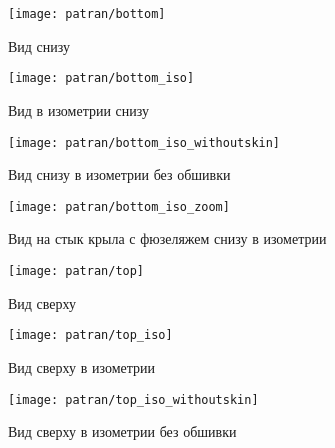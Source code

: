 \begin{figure}[H]
\centering
\texttt{[image: patran/bottom]}
\caption{Вид снизу}
\label{fig:patranBottom}
\end{figure}

\begin{figure}[H]
\centering
\texttt{[image: patran/bottom\_iso]}
\caption{Вид в изометрии снизу}
\label{fig:patranBottomIso}
\end{figure}

\begin{figure}[H]
\centering
\texttt{[image: patran/bottom\_iso\_withoutskin]}
\caption{Вид снизу в изометрии без обшивки}
\label{fig:patranBottomIsoWithoutSkin}
\end{figure}

\begin{figure}[H]
\centering
\texttt{[image: patran/bottom\_iso\_zoom]}
\caption{Вид на стык крыла с фюзеляжем снизу в изометрии}
\label{fig:patranBottomIsoZoom}
\end{figure}

\begin{figure}[H]
\centering
\texttt{[image: patran/top]}
\caption{Вид сверху}
\label{fig:patranTop}
\end{figure}

\begin{figure}[H]
\centering
\texttt{[image: patran/top\_iso]}
\caption{Вид сверху в изометрии}
\label{fig:patranTopIso}
\end{figure}

\begin{figure}[H]
\centering
\texttt{[image: patran/top\_iso\_withoutskin]}
\caption{Вид сверху в изометрии без обшивки}
\label{fig:patranTopIsoWithoutSk}
\end{figure}

%
